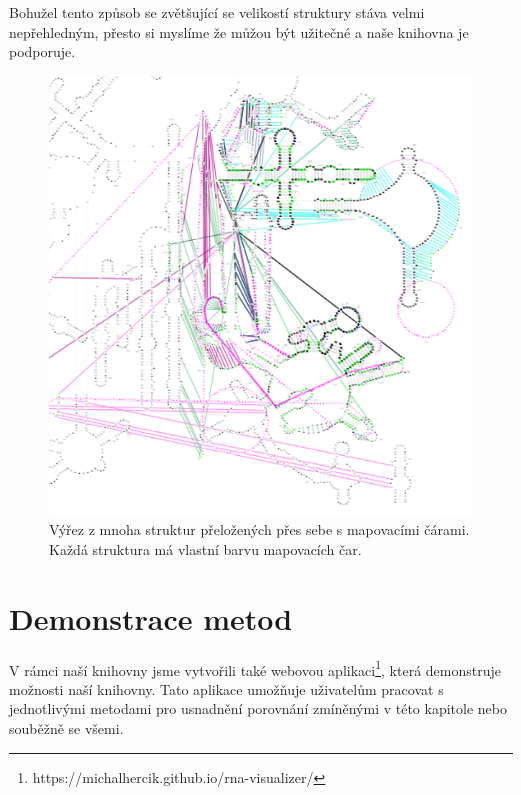 Bohužel tento způsob se zvětšující se velikostí struktury stáva velmi
nepřehledným, přesto si myslíme že můžou být užitečné a naše knihovna je
podporuje.

\begin{figure}[H]
  \centering
  \includegraphics[width=140mm]{../img/kap02/mappingLines/big.png}
  \caption{Výřez z mnoha struktur přeložených přes sebe s mapovacími čárami.
  Každá struktura má vlastní barvu mapovacích čar.}
\end{figure}

\section{Demonstrace metod}

V rámci naší knihovny jsme vytvořili také webovou
aplikaci\footnote{https://michalhercik.github.io/rna-visualizer/}, která
demonstruje možnosti naší knihovny. Tato aplikace umožňuje uživatelům pracovat
s jednotlivými metodami pro usnadnění porovnání zmíněnými v této kapitole nebo
souběžně se všemi.
